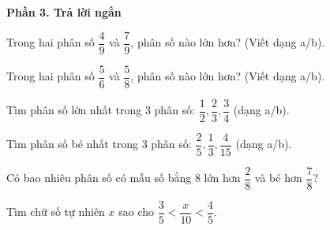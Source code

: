 \textbf{Phần 3. Trả lời ngắn}

\begin{ex} %
Trong hai phân số $\dfrac{4}{9}$ và $\dfrac{7}{9}$, phân số nào lớn hơn? (Viết dạng a/b).
\end{ex}

\begin{ex} %
Trong hai phân số $\dfrac{5}{6}$ và $\dfrac{5}{8}$, phân số nào lớn hơn? (Viết dạng a/b).
\end{ex}

\begin{ex} %
Tìm phân số lớn nhất trong 3 phân số: $\dfrac{1}{2}, \dfrac{2}{3}, \dfrac{3}{4}$ (dạng a/b).
\end{ex}

\begin{ex} %
Tìm phân số bé nhất trong 3 phân số: $\dfrac{2}{5}, \dfrac{1}{3}, \dfrac{4}{15}$ (dạng a/b).
\end{ex}

\begin{ex} %
Có bao nhiêu phân số có mẫu số bằng 8 lớn hơn $\dfrac{2}{8}$ và bé hơn $\dfrac{7}{8}$?
\end{ex}

\begin{ex} %
Tìm chữ số tự nhiên $x$ sao cho $\dfrac{3}{5} < \dfrac{x}{10} < \dfrac{4}{5}$.
\end{ex}
